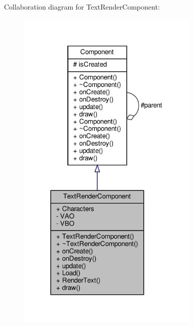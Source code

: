Collaboration diagram for Text\+Render\+Component\+:
\nopagebreak
\begin{figure}[H]
\begin{center}
\leavevmode
\includegraphics[width=248pt]{classTextRenderComponent__coll__graph}
\end{center}
\end{figure}
